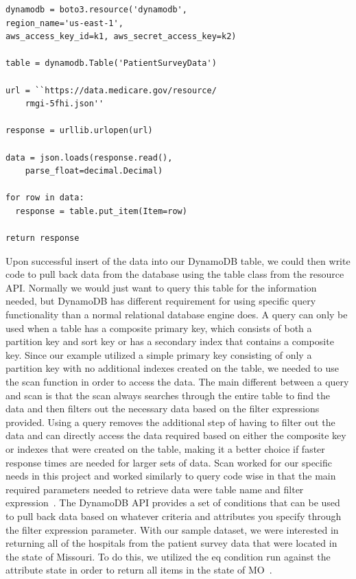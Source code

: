 \begin{verbatim}
dynamodb = boto3.resource('dynamodb', 
region_name='us-east-1', 
aws_access_key_id=k1, aws_secret_access_key=k2)

table = dynamodb.Table('PatientSurveyData')

url = ``https://data.medicare.gov/resource/
	rmgi-5fhi.json''

response = urllib.urlopen(url)

data = json.loads(response.read(), 
	parse_float=decimal.Decimal)

for row in data:
  response = table.put_item(Item=row)

return response
\end{verbatim}

Upon successful insert of the data into our DynamoDB table, we could then 
write code to pull back data from the database using the table class from 
the resource API. Normally we would just want to query this table for the 
information needed, but DynamoDB has different requirement for using specific 
query functionality than a normal relational database engine does. A query can 
only be used when a table has a composite primary key, which consists of both 
a partition key and sort key or has a secondary index that contains a 
composite key. Since our example utilized a simple primary key consisting of 
only a partition key with no additional indexes created on the table, we 
needed to use the scan function in order to access the data. The main 
different between a query and scan is that the scan always searches through 
the entire table to find the data and then filters out the necessary data 
based on the filter expressions provided. Using a query removes the additional 
step of having to filter out the data and can directly access the data 
required based on either the composite key or indexes that were created on the 
table, making it a better choice if faster response times are needed for 
larger sets of data. Scan worked for our specific needs in this project and 
worked similarly to query code wise in that the main required parameters 
needed to retrieve data were table name and filter 
expression~\cite{hid-sp18-521-botodynamodb}. The DynamoDB API provides a set 
of conditions that can be used to pull back data based on whatever criteria 
and attributes you specify through the filter expression parameter. With our 
sample dataset, we were interested in returning all of the hospitals from the 
patient survey data that were located in the state of Missouri. To do this, we 
utilized the eq condition run against the attribute state in order to return 
all items in the state of MO~\cite{hid-sp18-boto-dynamodbconditions}.  

